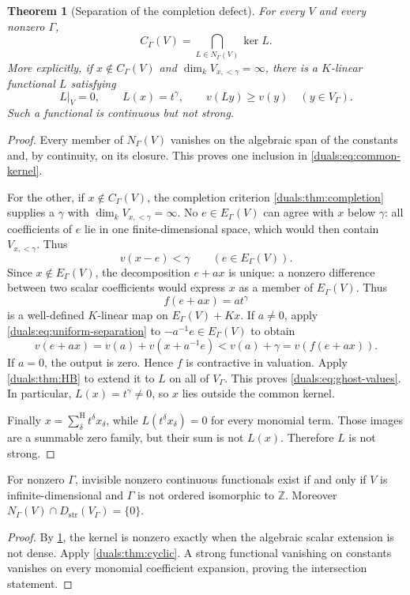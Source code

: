 \documentclass[11pt,letterpaper]{article}
\numberwithin{equation}{section}
\newtheorem{theorem}{Theorem}[section]
\theoremstyle{definition}
\theoremstyle{remark}
\newcommand{\Z}{\mathbb Z}
\newcommand{\Dstr}{D_{\mathrm{str}}}
\newcommand{\sH}{\mathop{\sum}\nolimits^{\mathrm H}}
\begin{document}
\begin{theorem}[Separation of the completion defect]
\label{duals:thm:separation}
For every $V$ and every nonzero $\Gamma$,
\begin{equation}\label{duals:eq:common-kernel}
 C_\Gamma(V)=\bigcap_{L\in N_\Gamma(V)}\ker L.
\end{equation}
More explicitly, if $x\notin C_\Gamma(V)$ and
$\dim_kV_{x,<\gamma}=\infty$, there is a $K$-linear functional $L$
satisfying
\begin{equation}\label{duals:eq:ghost-values}
 L|_V=0,\qquad L(x)=t^\gamma,\qquad
 v(Ly)\ge v(y)\quad(y\in V_\Gamma).
\end{equation}
Such a functional is continuous but not strong.
\end{theorem}
\begin{proof}
Every member of $N_\Gamma(V)$ vanishes on the algebraic span of the
constants and, by continuity, on its closure. This proves one inclusion
in \eqref{duals:eq:common-kernel}.

For the other, if $x\notin C_\Gamma(V)$, the completion criterion
\cref{duals:thm:completion} supplies a $\gamma$ with
$\dim_kV_{x,<\gamma}=\infty$. No $e\in E_\Gamma(V)$ can agree
with $x$ below $\gamma$: all coefficients of $e$ lie in one
finite-dimensional space, which would then contain $V_{x,<\gamma}$.
Thus
\begin{equation}\label{duals:eq:uniform-separation}
 v(x-e)<\gamma\qquad(e\in E_\Gamma(V)).
\end{equation}
Since $x\notin E_\Gamma(V)$, the decomposition $e+ax$ is unique:
a nonzero difference between two scalar coefficients would express
$x$ as a member of $E_\Gamma(V)$. Thus
\[
 f(e+ax)=a t^\gamma
\]
is a well-defined $K$-linear map on $E_\Gamma(V)+Kx$.
If $a\ne0$, apply \eqref{duals:eq:uniform-separation} to
$-a^{-1}e\in E_\Gamma(V)$ to obtain
\[
 v(e+ax)=v(a)+v(x+a^{-1}e)<v(a)+\gamma=v(f(e+ax)).
\]
If $a=0$, the output is zero. Hence $f$ is contractive in valuation.
Apply \cref{duals:thm:HB} to extend it to $L$ on all of $V_\Gamma$.
This proves \eqref{duals:eq:ghost-values}. In particular,
$L(x)=t^\gamma\ne0$, so $x$ lies outside the common kernel.

Finally $x=\sH_\delta t^\delta x_\delta$, while
$L(t^\delta x_\delta)=0$ for every monomial term. Those images are a
summable zero family, but their sum is not $L(x)$. Therefore $L$ is
not strong.
\end{proof}

\begin{corollary}\label{duals:cor:ghost-boundary}
For nonzero $\Gamma$, invisible nonzero continuous functionals exist
if and only if $V$ is infinite-dimensional and $\Gamma$ is not ordered
isomorphic to $\Z$. Moreover
$N_\Gamma(V)\cap\Dstr(V_\Gamma)=\{0\}$.
\end{corollary}
\begin{proof}
By \cref{duals:thm:separation}, the kernel is nonzero exactly when the
algebraic scalar extension is not dense. Apply \cref{duals:thm:cyclic}.
A strong functional vanishing on constants vanishes on every monomial
coefficient expansion, proving the intersection statement.
\end{proof}
\end{document}
